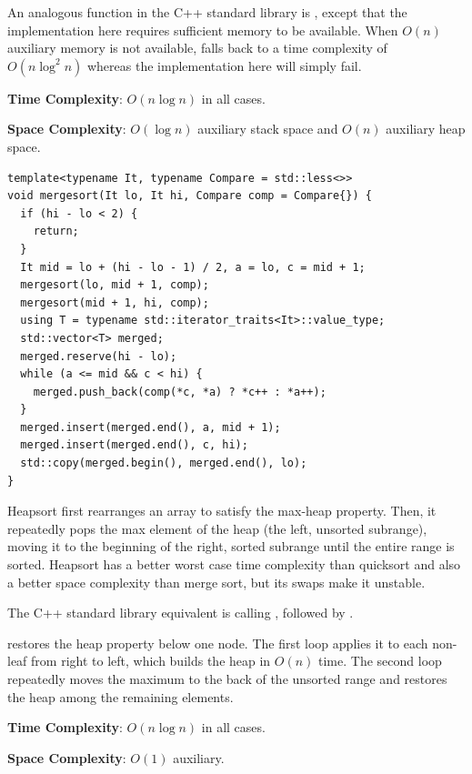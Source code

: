 An analogous function in the C++ standard library is , except that the implementation here requires sufficient memory to be available. When $O(n)$ auxiliary memory is not available,  falls back to a time complexity of $O(n \log^{2} n)$ whereas the implementation here will simply fail.

\textbf{Time Complexity}: $O(n \log n)$ in all cases.

\textbf{Space Complexity}: $O(\log n)$ auxiliary stack space and $O(n)$ auxiliary heap space.

\begin{lstlisting}[style=cpp]
template<typename It, typename Compare = std::less<>>
void mergesort(It lo, It hi, Compare comp = Compare{}) {
  if (hi - lo < 2) {
    return;
  }
  It mid = lo + (hi - lo - 1) / 2, a = lo, c = mid + 1;
  mergesort(lo, mid + 1, comp);
  mergesort(mid + 1, hi, comp);
  using T = typename std::iterator_traits<It>::value_type;
  std::vector<T> merged;
  merged.reserve(hi - lo);
  while (a <= mid && c < hi) {
    merged.push_back(comp(*c, *a) ? *c++ : *a++);
  }
  merged.insert(merged.end(), a, mid + 1);
  merged.insert(merged.end(), c, hi);
  std::copy(merged.begin(), merged.end(), lo);
}
\end{lstlisting}
Heapsort first rearranges an array to satisfy the max-heap property. Then, it repeatedly pops the max element of the heap (the left, unsorted subrange), moving it to the beginning of the right, sorted subrange until the entire range is sorted. Heapsort has a better worst case time complexity than quicksort and also a better space complexity than merge sort, but its swaps make it unstable.

The C++ standard library equivalent is calling , followed by .

 restores the heap property below one node. The first loop applies it to each non-leaf from right to left, which builds the heap in $O(n)$ time. The second loop repeatedly moves the maximum to the back of the unsorted range and restores the heap among the remaining elements.

\textbf{Time Complexity}: $O(n \log n)$ in all cases.

\textbf{Space Complexity}: $O(1)$ auxiliary.

